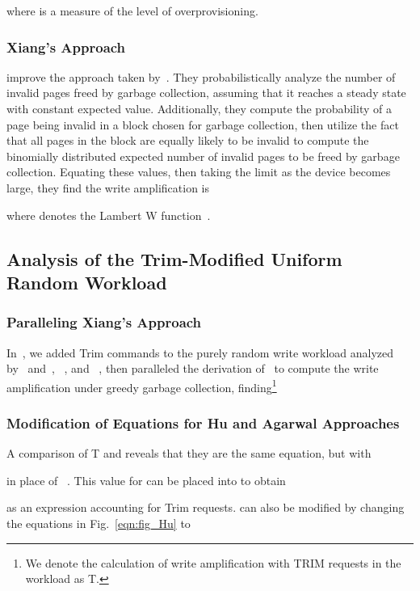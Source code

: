 \documentclass[prodmode,acmtos]{acmsmall}
\begin{document}
where  is a measure of the level of overprovisioning.
\subsubsection{Xiang's Approach}
 improve the approach taken by~.  They probabilistically analyze the number of invalid pages freed by garbage collection, assuming that it reaches a steady state with constant expected value.  Additionally, they compute the probability of a page being invalid in a block chosen for garbage collection, then utilize the fact that all pages in the block are equally likely to be invalid to compute the binomially distributed expected number of invalid pages to be freed by garbage collection.  Equating these values, then taking the limit as the device becomes large, they find the write amplification is

where  denotes the Lambert W function~\cite{corless1996lambertw,xiang2011improved}.


\subsection{Analysis of the Trim-Modified Uniform Random Workload}
\subsubsection{Paralleling Xiang's Approach}
In~\cite{frankie2012_ciit}, we added Trim commands to the purely random write workload analyzed by~ and~, ~, and ~, then paralleled the derivation of~ to compute the write amplification under greedy garbage collection, finding\footnote{We denote the calculation of write amplification with TRIM requests in the workload as T.}


\subsubsection{Modification of Equations for Hu and Agarwal Approaches}
A comparison of T and  reveals that they are the same equation, but with

in place of ~\cite{frankie2012_ciit}.  This value for  can be placed into  to obtain

as an expression accounting for Trim requests.   can also be modified by changing the equations in Fig.~\ref{eqn:fig_Hu} to
\end{document}
